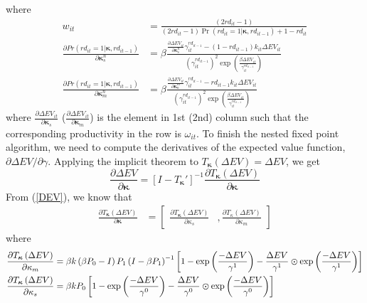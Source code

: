 \documentclass[11pt]{article}
\begin{document}
where
\begin{align*}
w_{it} & =\frac{\left(2rd_{it}-1\right)}{\left(2rd_{it}-1\right)\Pr\left(rd_{it}=1|\boldsymbol{\kappa},rd_{it-1}\right)+1-rd_{it}}\\
\frac{\partial Pr\left(rd_{it}=1|\boldsymbol{\kappa},rd_{it-1}\right)}{\partial\boldsymbol{\kappa}_{s}^{n}} & =\beta\frac{\frac{\partial\Delta EV_{it}}{\partial\boldsymbol{\kappa}_{s}^{n}}\gamma_{it}^{rd_{it-1}}-\left(1-rd_{it-1}\right)k_{it}\Delta EV_{it}}{\left(\gamma_{it}^{rd_{it-1}}\right)^{2}\exp\left(\frac{\beta\Delta EV_{it}}{\gamma_{it}^{rd_{it-1}}}\right)}\\
\frac{\partial Pr\left(rd_{it}=1|\boldsymbol{\kappa},rd_{it-1}\right)}{\partial\boldsymbol{\kappa}_{m}^{n}} & =\beta\frac{\frac{\partial\Delta EV_{it}}{\partial\boldsymbol{\kappa}_{n}^{m}}\gamma_{it}^{rd_{it-1}}-rd_{it-1}k_{it}\Delta EV_{it}}{\left(\gamma_{it}^{rd_{it-1}}\right)^{2}\exp\left(\frac{\beta\Delta EV_{it}}{\gamma_{it}^{rd_{it-1}}}\right)}
\end{align*}
where $\frac{\partial\Delta EV_{it}}{\partial\boldsymbol{\kappa}_{s}}$ ($\frac{\partial\Delta EV_{it}}{\partial\boldsymbol{\kappa}_{m}}$)
is the element in 1st (2nd) column such that the corresponding productivity
in the row is $\omega_{it}$. To finish the nested fixed point algorithm,
we need to compute the derivatives of the expected value function,
$\partial\Delta EV/\partial\gamma$. Applying the implicit theorem
to $T_{\boldsymbol{\kappa}}\left(\Delta EV\right)=\Delta EV$, we get 
\[
\frac{\partial\Delta EV}{\partial\boldsymbol{\kappa}}=\left[I-T_{\boldsymbol{\kappa}}'\right]^{-1}\frac{\partial T_{\boldsymbol{\kappa}}\left(\Delta EV\right)}{\partial\boldsymbol{\kappa}}
\]
From (\ref{DEV}), we know that 
\begin{align*}
\frac{\partial T_{\boldsymbol{\kappa}}\left(\Delta EV\right)}{\partial\boldsymbol{\kappa}} & =\left[\begin{array}{cc}
\frac{\partial T_{\boldsymbol{\kappa}}\left(\Delta EV\right)}{\partial\kappa_{s}} & ,\frac{\partial T_{\kappa}\left(\Delta EV\right)}{\partial\kappa_{m}}\end{array}\right]
\end{align*}
where 
\begin{align*}
\frac{\partial T_{\boldsymbol{\kappa}}\left(\Delta EV\right)}{\partial\kappa_{m}} & =\beta k\left(\beta P_{0}-I\right)P_{1}\left(I-\beta P_{1}\right)^{-1}\left[1-\exp\left(\frac{-\Delta EV}{\gamma^{1}}\right)-\frac{\Delta EV}{\gamma^{1}}\varodot\exp\left(\frac{-\Delta EV}{\gamma^{1}}\right)\right]\\ 
\frac{\partial T_{\boldsymbol{\kappa}}\left(\Delta EV\right)}{\partial\kappa_{s}} & =\beta kP_{0}\left[1-\exp\left(\frac{-\Delta EV}{\gamma^{0}}\right)-\frac{\Delta EV}{\gamma^{0}}\varodot\exp\left(\frac{-\Delta EV}{\gamma^{0}}\right)\right]
\end{align*}
\end{document}

